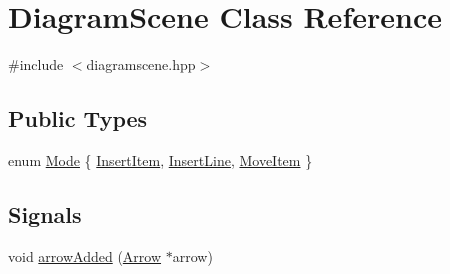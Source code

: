 \hypertarget{class_diagram_scene}{
\section{DiagramScene Class Reference}
\label{class_diagram_scene}
}


{\ttfamily \#include $<$diagramscene.hpp$>$}

\subsection*{Public Types}
\begin{DoxyCompactItemize}
\item 
enum \hyperlink{class_diagram_scene_a77383a13f4ef28e6617558b1cd5ea52d}{Mode} \{ \hyperlink{class_diagram_scene_a77383a13f4ef28e6617558b1cd5ea52da93c81e7a22dfeed5c91a4eaa8b8591fe}{InsertItem}, 
\hyperlink{class_diagram_scene_a77383a13f4ef28e6617558b1cd5ea52da277ff8078362c3ebdd47fd67d77d7210}{InsertLine}, 
\hyperlink{class_diagram_scene_a77383a13f4ef28e6617558b1cd5ea52da4b36b9ff2d2068613991a9ad49307e40}{MoveItem}
 \}
\end{DoxyCompactItemize}
\subsection*{Signals}
\begin{DoxyCompactItemize}
\item 
void \hyperlink{class_diagram_scene_a4651bd095028566a8b76319196d13eb2}{arrowAdded} (\hyperlink{class_arrow}{Arrow} $\ast$arrow)
\end{DoxyCompactItemize}
